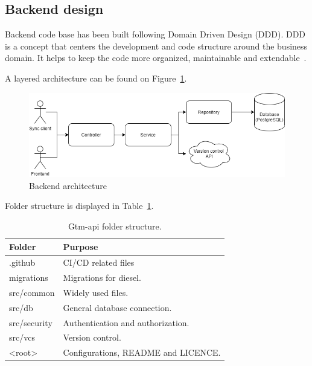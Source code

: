 \subsection{Backend design}\label{subsec:backend-design}
Backend code base has been built following Domain Driven Design (DDD).
DDD is a concept that centers the development and code structure around the business domain.
It helps to keep the code more organized, maintainable and extendable~\cite{domain-driven-design}.

A layered architecture can be found on Figure~\ref{fig:backend-layered-diagram}.
\begin{figure}[H]
    \includegraphics[width=\textwidth]{figures/backend_layered_diagram}
    \caption{Backend architecture}
    \label{fig:backend-layered-diagram}
\end{figure}

Folder structure is displayed in Table~\ref{tab:gtm-api-folder-structure}.
\begin{table}[h]
    \centering
    \begin{tabular}{ | p{3cm} | p{10cm} |}
        \hline
        Folder & Purpose\\
        \hline
        .github & CI/CD related files\\
        \hline
        migrations & Migrations for diesel. \\
        \hline
        src/common & Widely used files.\\
        \hline
        src/db & General database connection.\\
        \hline
        src/security & Authentication and authorization.\\
        \hline
        src/vcs & Version control.\\
        \hline
        <root> & Configurations, README and LICENCE.\\
        \hline
    \end{tabular}
    \caption{Gtm-api folder structure.}
    \label{tab:gtm-api-folder-structure}
\end{table}


